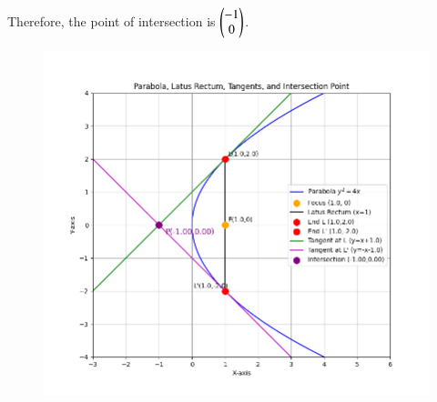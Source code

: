 \documentclass[journal]{IEEEtran}
\begin{document}
Therefore, the point of intersection is $\begin{pmatrix}-1 \\ 0\end{pmatrix}$.


\begin{figure}[H]
\centering
\includegraphics[width=0.7\columnwidth]{figs/mat181.png}
\caption{}
\label{fig:1}
\end{figure}
\end{document}
